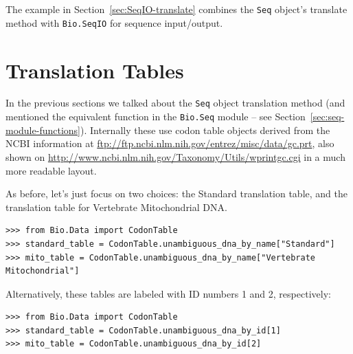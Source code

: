 \documentclass{report}
\begin{document}
The example in Section~\ref{sec:SeqIO-translate} combines the \verb|Seq| object's
translate method with \verb|Bio.SeqIO| for sequence input/output.

\section{Translation Tables}

In the previous sections we talked about the \verb|Seq| object translation method (and mentioned the equivalent function in the \verb|Bio.Seq| module -- see
Section~\ref{sec:seq-module-functions}).
Internally these use codon table objects derived from the NCBI information at
\url{ftp://ftp.ncbi.nlm.nih.gov/entrez/misc/data/gc.prt}, also shown on
\url{http://www.ncbi.nlm.nih.gov/Taxonomy/Utils/wprintgc.cgi} in a much more readable layout.

As before, let's just focus on two choices: the Standard translation table, and the
translation table for Vertebrate Mitochondrial DNA. 

\begin{verbatim}
>>> from Bio.Data import CodonTable
>>> standard_table = CodonTable.unambiguous_dna_by_name["Standard"]
>>> mito_table = CodonTable.unambiguous_dna_by_name["Vertebrate Mitochondrial"]
\end{verbatim}

Alternatively, these tables are labeled with ID numbers 1 and 2, respectively:
\begin{verbatim}
>>> from Bio.Data import CodonTable
>>> standard_table = CodonTable.unambiguous_dna_by_id[1]
>>> mito_table = CodonTable.unambiguous_dna_by_id[2]
\end{verbatim}
\end{document}
